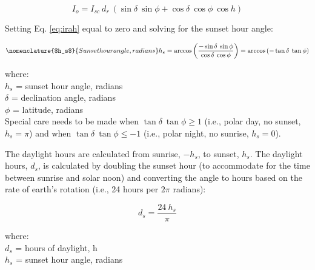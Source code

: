 \begin{equation}
\label{eq:irah}
	I_o = I_{sc}\: d_r\: \left( \sin\delta\: \sin\phi + 
	      \cos\delta\: \cos\phi\: \cos h \right)
\end{equation}

\noindent Setting Eq. \ref{eq:irah} equal to zero and solving for the sunset hour angle:

\begin{equation}
\nomenclature{$h_s$}{Sunset hour angle, radians}
\label{eq:hs}
	h_s  = \arccos\left(\frac{-\sin\delta\: \sin\phi}
		                          {\cos\delta\: \cos\phi}\right)
		 = \arccos\left(-\tan\delta\: \tan\phi\right)
\end{equation}

\noindent where:\\
\indent $h_s$ = sunset hour angle, radians\\
\indent $\delta$ = declination angle, radians\\
\indent $\phi$ = latitude, radians\\

\noindent Special care needs to be made when $\tan\delta\:\tan\phi \geq 1$ (i.e., polar day, no sunset, $h_s = \pi$) and when $\tan\delta\:\tan\phi \leq -1$ (i.e., polar night, no sunrise, $h_s = 0$).

The daylight hours are calculated from sunrise, $-h_s$, to sunset, $h_s$. 
The daylight hours, $d_s$, is calculated by doubling the sunset hour (to accommodate for the time between sunrise and solar noon) and converting the angle to hours based on the rate of earth's rotation (i.e., 24 hours per $2\pi$ radians):

\begin{equation}
\label{eq:ds}
	d_s  = \frac{24\: h_s}{\pi}
\end{equation}

\noindent where:\\
\indent $d_s$ = hours of daylight, h \\
\indent $h_s$ = sunset hour angle, radians \\ 

